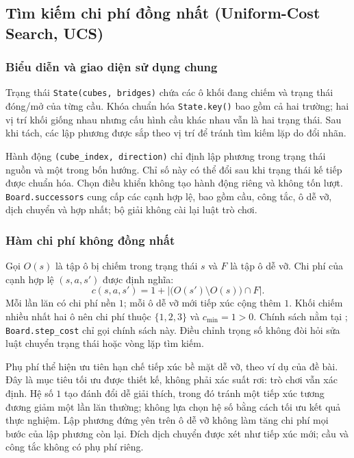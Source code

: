 \subsection{Tìm kiếm chi phí đồng nhất (Uniform-Cost Search, UCS)}
\label{sec:bloxorz-ucs}

\subsubsection{Biểu diễn và giao diện sử dụng chung}
Trạng thái \texttt{State(cubes, bridges)} chứa các ô khối đang chiếm và trạng thái
đóng/mở của từng cầu. Khóa chuẩn hóa \texttt{State.key()} bao gồm cả hai trường;
hai vị trí khối giống nhau nhưng cấu hình cầu khác nhau vẫn là hai trạng thái.
Sau khi tách, các lập phương được sắp theo vị trí để tránh tìm kiếm lặp do đổi nhãn.

Hành động \texttt{(cube\_index, direction)} chỉ định lập phương trong trạng thái
nguồn và một trong bốn hướng. Chỉ số này có thể đổi sau khi trạng thái kế tiếp
được chuẩn hóa. Chọn điều khiển không tạo hành động riêng và không tốn lượt.
\texttt{Board.successors} cung cấp các cạnh hợp lệ, bao gồm cầu, công tắc, ô dễ
vỡ, dịch chuyển và hợp nhất; bộ giải không cài lại luật trò chơi.

\subsubsection{Hàm chi phí không đồng nhất}
Gọi $O(s)$ là tập ô bị chiếm trong trạng thái $s$ và $F$ là tập ô dễ vỡ. Chi phí
của cạnh hợp lệ $(s,a,s')$ được định nghĩa:
\begin{equation}
  c(s,a,s')=1+\left|\bigl(O(s')\setminus O(s)\bigr)\cap F\right|.
  \label{eq:bloxorz-action-cost}
\end{equation}
Mỗi lần lăn có chi phí nền $1$; mỗi ô dễ vỡ mới tiếp xúc cộng thêm $1$.
Khối chiếm nhiều nhất hai ô nên chi phí thuộc $\{1,2,3\}$ và
$c_{\min}=1>0$. Chính sách nằm tại ;
\texttt{Board.step\_cost} chỉ gọi chính sách này. Điều chỉnh trọng số không đòi
hỏi sửa luật chuyển trạng thái hoặc vòng lặp tìm kiếm.

Phụ phí thể hiện ưu tiên hạn chế tiếp xúc bề mặt dễ vỡ, theo ví dụ của đề bài.
Đây là mục tiêu tối ưu được thiết kế, không phải xác suất rơi: trò chơi vẫn xác
định. Hệ số $1$ tạo đánh đổi dễ giải thích, trong đó tránh một tiếp xúc tương
đương giảm một lần lăn thường; không lựa chọn hệ số bằng cách tối ưu kết quả
thực nghiệm. Lập phương đứng yên trên ô dễ vỡ không làm tăng chi phí mọi bước
của lập phương còn lại. Đích dịch chuyển được xét như tiếp xúc mới; cầu và công
tắc không có phụ phí riêng.


